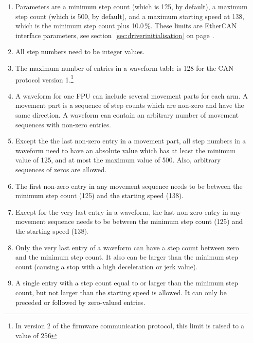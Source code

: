 \documentclass[11pt,a4paper]{scrartcl}
\begin{document}
\begin{enumerate}
\item Parameters are a minimum step count (which is 125, by default),
  a maximum step count (which is 500, by default), and a maximum
  starting speed at 138, which is the minimum step count plus 10.0\,\%.  These
  limits are EtherCAN interface parameters, see
  section~\ref{sec:driverinitialisation} on
  page~\pageref{sec:driverinitialisation}.


\item All step numbers need to be integer values.

\item The maximum number of entries in a waveform table is 128 for the
  CAN protocol version 1.\footnote{In version 2 of the firmware
    communication protocol, this limit is raised to a value of 256}
  
\item A waveform for one FPU can include several movement parts for
  each arm. A movement part is a sequence of step counts which are
  non-zero and have the same direction.  A waveform can contain an
  arbitrary number of movement sequences with non-zero entries.


\item Except the the last non-zero entry in a movement part, all step
  numbers in a waveform need to have an absolute value which has at
  least the minimum value of 125, and at most the maximum value of
  500. Also, arbitrary sequences of zeros are allowed.
  
\item The first non-zero entry in any movement sequence needs to be
  between the minimum step count (125) and the starting speed (138).
  
\item Except for the very last entry in a waveform, the last non-zero
  entry in any movement sequence needs to be between the minimum step
  count (125) and the starting speed (138).
  
\item Only the very last entry of a waveform can have a step count
  between zero and the minimum step count. It also can be larger than
  the minimum step count (causing a stop with a high deceleration or
  jerk value).
  
\item A single entry with a step count equal to or larger than the
  minimum step count, but not larger than the starting speed is
  allowed. It can only be preceded or followed by zero-valued entries.
  

\end{enumerate}
\end{document}
